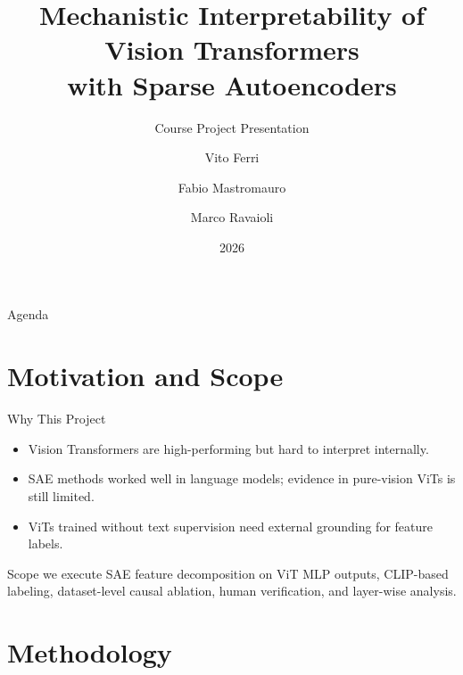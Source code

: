 \documentclass[aspectratio=169,t,xcolor=table]{beamer}
\title[ViT SAE Interpretability]{Mechanistic Interpretability of Vision Transformers\\with Sparse Autoencoders}
\subtitle{Course Project Presentation}
\author[V. Ferri et al.]{Vito Ferri \and Fabio Mastromauro \and Marco Ravaioli}
\institute[PoliTO]{Politecnico di Torino}
\date{2026}
\begin{document}
\frame[noframenumbering]{\titlepage}

\begin{frame}{Agenda}
\tableofcontents
\end{frame}

\section{Motivation and Scope}

\begin{frame}{Why This Project}
\begin{itemize}
    \item Vision Transformers are high-performing but hard to interpret internally.
    \item SAE methods worked well in language models; evidence in pure-vision ViTs is still limited.
    \item ViTs trained without text supervision need external grounding for feature labels.
\end{itemize}

\vspace{0.4em}
\begin{block}{Scope we execute}
SAE feature decomposition on ViT MLP outputs, CLIP-based labeling, dataset-level causal ablation, human verification, and layer-wise analysis.
\end{block}

\end{frame}

\section{Methodology}
\end{document}
